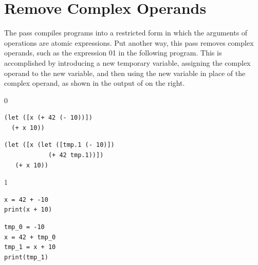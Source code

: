 \documentclass[7x10]{TimesAPriori_MIT}%
\def\racketEd{0}
\def\pythonEd{1}
\def\edition{1}
\newcommand{\racket}[1]{{\if\edition\racketEd{#1}\fi}}
\newcommand{\pythonColor}[0]{}
\newcommand{\python}[1]{{\if\edition\pythonEd\pythonColor #1\fi}}
\numberwithin{theorem}{chapter}
\numberwithin{definition}{chapter}
\numberwithin{equation}{chapter}
\begin{document}
\section{Remove Complex Operands}
\label{sec:remove-complex-opera-Lvar}

The  pass compiles \LangVar{} programs
into a restricted form in which the arguments of operations are atomic
expressions.  Put another way, this pass removes complex
operands, such as the expression
\racket{}\python{}
in the following program. This is accomplished by introducing a new
temporary variable, assigning the complex operand to the new
variable, and then using the new variable in place of the complex
operand, as shown in the output of  on the
right.
{\if\edition\racketEd
\begin{transformation}
\begin{lstlisting}
(let ([x (+ 42 (- 10))])
  (+ x 10))
\end{lstlisting}
\compilesto
\begin{lstlisting}
(let ([x (let ([tmp.1 (- 10)])
            (+ 42 tmp.1))])
   (+ x 10))
\end{lstlisting}
\end{transformation}
\fi}
{\if\edition\pythonEd\pythonColor
\begin{transformation}  
\begin{lstlisting}
x = 42 + -10
print(x + 10)
\end{lstlisting}
\compilesto
\begin{lstlisting}
tmp_0 = -10
x = 42 + tmp_0
tmp_1 = x + 10
print(tmp_1)
\end{lstlisting}
\end{transformation}
\fi}


\newcommand{\LvarMonadASTRacket}{
\begin{array}{rcl}
\Atm &::=& \INT{\Int} \MID \VAR{\Var} \\
\Exp &::=& \Atm \MID \READ{} \\
     &\MID& \NEG{\Atm} \MID \ADD{\Atm}{\Atm} \MID \SUB{\Atm}{\Atm} \\
     &\MID&  \LET{\Var}{\Exp}{\Exp} \\
\end{array}
}  

\newcommand{\LvarMonadASTPython}{
\begin{array}{rcl}
\Atm &::=& \INT{\Int} \MID \VAR{\Var} \\  
\Exp{} &::=& \Atm \MID \READ{} \\
       &\MID& \UNIOP{\key{USub()}}{\Atm} \MID \BINOP{\Atm}{\key{Add()}}{\Atm}  \\
       &\MID& \BINOP{\Atm}{\key{Sub()}}{\Atm} \\ 
\Stmt{} &::=& \PRINT{\Atm} \MID \EXPR{\Exp} \\
        &\MID& \ASSIGN{\VAR{\Var}}{\Exp}
\end{array}
}
\end{document}

